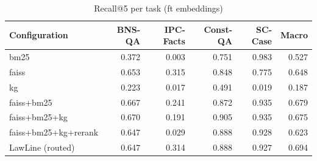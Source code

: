 \begin{table}
\caption{Recall@5 per task (ft embeddings)}
\label{tab:per_task_ft}
\begin{tabular}{lrrrrr}
\toprule
Configuration & BNS-QA & IPC-Facts & Const-QA & SC-Case & Macro \\
\midrule
bm25 & 0.372 & 0.003 & 0.751 & 0.983 & 0.527 \\
faiss & 0.653 & 0.315 & 0.848 & 0.775 & 0.648 \\
kg & 0.223 & 0.017 & 0.491 & 0.019 & 0.187 \\
faiss+bm25 & 0.667 & 0.241 & 0.872 & 0.935 & 0.679 \\
faiss+bm25+kg & 0.670 & 0.191 & 0.905 & 0.935 & 0.675 \\
faiss+bm25+kg+rerank & 0.647 & 0.029 & 0.888 & 0.928 & 0.623 \\
LawLine (routed) & 0.647 & 0.314 & 0.888 & 0.927 & 0.694 \\
\bottomrule
\end{tabular}
\end{table}
